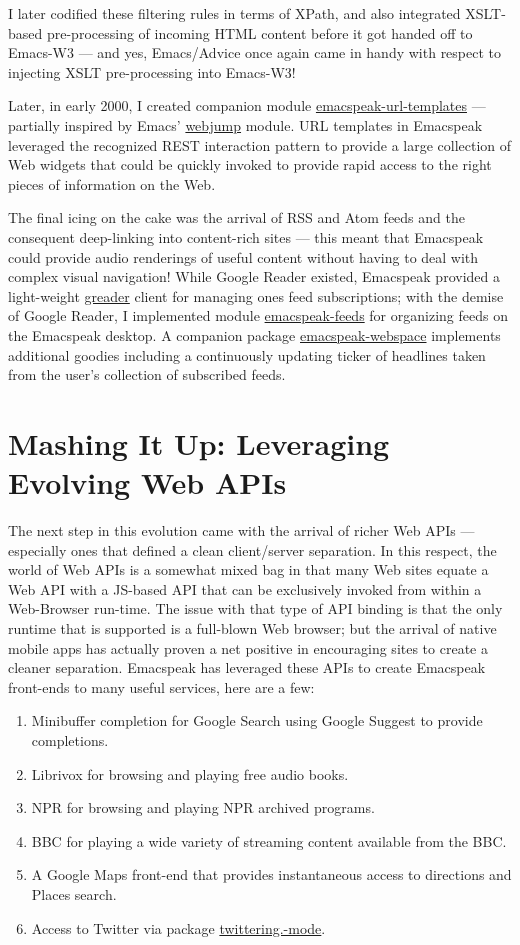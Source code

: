 \documentclass[11pt]{article}
\begin{document}
I later codified these filtering rules in terms of XPath, and
also integrated XSLT-based pre-processing of incoming HTML
content before it got handed off to Emacs-W3 — and yes,
Emacs/Advice once again came in handy with respect to injecting
XSLT pre-processing into Emacs-W3!

Later, in early 2000, I created companion module
\uline{emacspeak-url-templates} — partially inspired by Emacs'
\uline{webjump} module.
URL templates in Emacspeak leveraged the  recognized REST
interaction pattern to provide a large collection of Web widgets
that could be quickly invoked to provide rapid access to the
right pieces of information on the Web.

The final icing on the cake was the arrival of RSS and Atom feeds
and the consequent deep-linking into content-rich sites — this
meant that Emacspeak could provide audio renderings of useful
content without having to deal with complex visual navigation!
While Google Reader existed, Emacspeak provided a light-weight
\uline{greader} client for managing ones feed subscriptions; with the
demise of Google Reader, I implemented module \uline{emacspeak-feeds}
for organizing feeds on the Emacspeak desktop. A companion
package \uline{emacspeak-webspace} implements additional goodies
including a continuously updating ticker of headlines taken from
the user's collection of subscribed feeds.


\section{Mashing It Up: Leveraging Evolving Web APIs}
\label{sec-15}

The next step in this evolution came with the arrival of richer
Web APIs — especially ones that defined a clean client/server
separation. In this respect, the world of Web APIs is a somewhat
mixed bag in that many Web sites equate a Web API  with a
JS-based API that can be exclusively invoked from within a Web-Browser
run-time. 
The issue with that type of API  binding is that the only runtime
that is supported is a full-blown Web browser; but the arrival of
native mobile apps  has actually proven a net positive in
encouraging sites to create a cleaner separation. Emacspeak has
leveraged these APIs to create Emacspeak front-ends 
to many useful services, here are a few:

\begin{enumerate}
\item Minibuffer completion for Google Search using Google Suggest
to provide completions.
\item Librivox for browsing  and playing free audio books.
\item NPR  for browsing and playing NPR archived programs.
\item BBC for playing a wide variety of streaming content
available from the BBC.
\item A Google Maps front-end that  provides instantaneous access
to directions and Places search.
\item Access to Twitter via package \uline{twittering.-mode}.
\end{enumerate}
\end{document}
